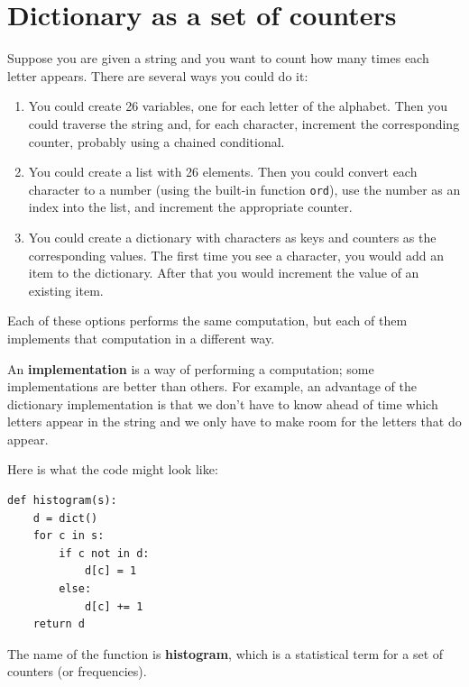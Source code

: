 \documentclass[10pt]{book}
\begin{document}
\section{Dictionary as a set of counters}
\label{histogram}

Suppose you are given a string and you want to count how many
times each letter appears.  There are several ways you could do it:

\begin{enumerate}

\item You could create 26 variables, one for each letter of the
alphabet.  Then you could traverse the string and, for each
character, increment the corresponding counter, probably using
a chained conditional.

\item You could create a list with 26 elements.  Then you could
convert each character to a number (using the built-in function
{\tt ord}), use the number as an index into the list, and increment
the appropriate counter.

\item You could create a dictionary with characters as keys
and counters as the corresponding values.  The first time you
see a character, you would add an item to the dictionary.  After
that you would increment the value of an existing item.

\end{enumerate}

Each of these options performs the same computation, but each
of them implements that computation in a different way.

An {\bf implementation} is a way of performing a computation;
some implementations are better than others.  For example,
an advantage of the dictionary implementation is that we don't
have to know ahead of time which letters appear in the string
and we only have to make room for the letters that do appear.

Here is what the code might look like:

\begin{verbatim}
def histogram(s):
    d = dict()
    for c in s:
        if c not in d:
            d[c] = 1
        else:
            d[c] += 1
    return d
\end{verbatim}
%
The name of the function is {\bf histogram}, which is a statistical
term for a set of counters (or frequencies).
\end{document}
